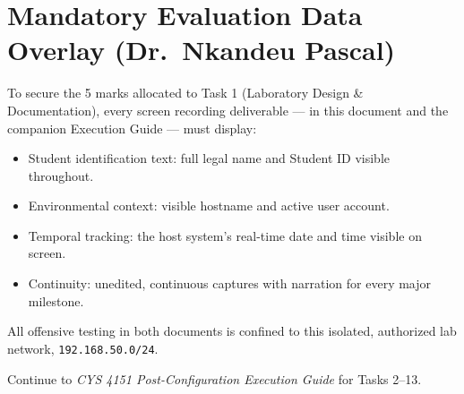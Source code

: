 \documentclass[11pt,a4paper]{article}
\begin{document}
\section{Mandatory Evaluation Data Overlay (Dr.\ Nkandeu Pascal)}

To secure the 5 marks allocated to Task 1 (Laboratory Design \& Documentation), every
screen recording deliverable --- in this document and the companion Execution Guide ---
must display:
\begin{itemize}[nosep]
\item Student identification text: full legal name and Student ID visible throughout.
\item Environmental context: visible hostname and active user account.
\item Temporal tracking: the host system's real-time date and time visible on screen.
\item Continuity: unedited, continuous captures with narration for every major
  milestone.
\end{itemize}

\begin{notebox}
All offensive testing in both documents is confined to this isolated, authorized lab
network, \texttt{192.168.50.0/24}.
\end{notebox}

\vfill
\begin{center}
\small\color{targetgrey}
Continue to \emph{CYS 4151 Post-Configuration Execution Guide} for Tasks 2--13.
\end{center}
\end{document}
